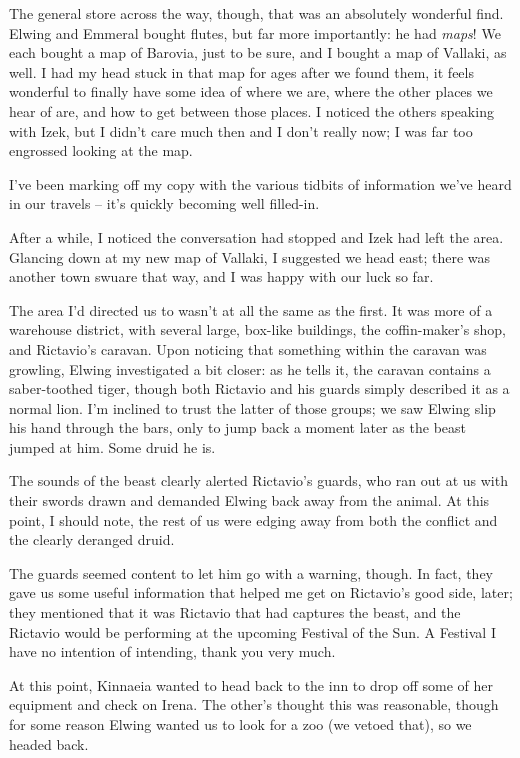 The general store across the way, though, that was an absolutely wonderful find. Elwing and Emmeral bought flutes, but far more importantly: he had \emph{maps}! We each bought a map of Barovia, just to be sure, and I bought a map of Vallaki, as well. I had my head stuck in that map for ages after we found them, it feels wonderful to finally have some idea of where we are, where the other places we hear of are, and how to get between those places. I noticed the others speaking with Izek, but I didn't care much then and I don't really now; I was far too engrossed looking at the map.

I've been marking off my copy with the various tidbits of information we've heard in our travels -- it's quickly becoming well filled-in.

After a while, I noticed the conversation had stopped and Izek had left the area. Glancing down at my new map of Vallaki, I suggested we head east; there was another town swuare that way, and I was happy with our luck so far.

The area I'd directed us to wasn't at all the same as the first. It was more of a warehouse district, with several large, box-like buildings, the coffin-maker's shop, and Rictavio's caravan. Upon noticing that something within the caravan was growling, Elwing investigated a bit closer: as he tells it, the caravan contains a saber-toothed tiger, though both Rictavio and his guards simply described it as a normal lion. I'm inclined to trust the latter of those groups; we saw Elwing slip his hand through the bars, only to jump back a moment later as the beast jumped at him. Some druid he is.

The sounds of the beast clearly alerted Rictavio's guards, who ran out at us with their swords drawn and demanded Elwing back away from the animal. At this point, I should note, the rest of us were edging away from both the conflict and the clearly deranged druid.

The guards seemed content to let him go with a warning, though. In fact, they gave us some useful information that helped me get on Rictavio's good side, later; they mentioned that it was Rictavio that had captures the beast, and the Rictavio would be performing at the upcoming Festival of the Sun. A Festival I have no intention of intending, thank you very much.

At this point, Kinnaeia wanted to head back to the inn to drop off some of her equipment and check on Irena. The other's thought this was reasonable, though for some reason Elwing wanted us to look for a zoo (we vetoed that), so we headed back.

